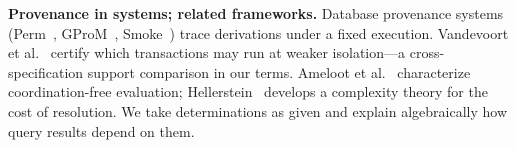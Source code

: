 \smallskip
\noindent\textbf{Provenance in systems; related frameworks.}
Database provenance systems (Perm~\cite{glavic2008perm},
GProM~\cite{arab2018gpromprovenance}, Smoke~\cite{psallidas2018smoke}) trace
derivations under a fixed execution. Vandevoort et
al.~\cite{vandevoort2025mixed} certify which transactions may run at weaker
isolation---a cross-specification support comparison in our terms. Ameloot et
al.~\cite{ameloot2013relational} characterize coordination-free evaluation;
Hellerstein~\cite{hellerstein2025complexity} develops a complexity theory for
the cost of resolution. We take determinations as given and explain
algebraically how query results depend on them.
